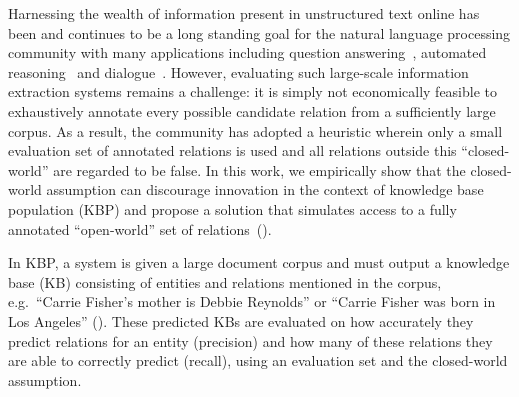 Harnessing the wealth of information present in unstructured text online has been and continues to be a long standing goal for the natural language processing community with many applications including question answering~\citep{berant2013freebase, fader2014open}, automated reasoning~\citep{kalyanpur2012structured} and dialogue~\citep{lee2015conversational,han2015exploiting}.
%
However, evaluating such large-scale information extraction systems remains a challenge:
it is simply not economically feasible to exhaustively annotate every possible candidate relation from a sufficiently large corpus.
As a result, the community has adopted a heuristic wherein only a small evaluation set of annotated relations is used and all relations outside this ``closed-world'' are regarded to be false.
In this work, we empirically show that the closed-world assumption can discourage innovation in the context of knowledge base population (KBP) and propose a solution that simulates access to a fully annotated ``open-world'' set of relations~().

In KBP, a system is given a large document corpus and must output a knowledge base (KB) consisting of entities and relations mentioned in the corpus, e.g.\ ``Carrie Fisher's mother is Debbie Reynolds'' or ``Carrie Fisher was born in Los Angeles'' (). %
These predicted KBs are evaluated on how accurately they predict relations for an entity (precision) and how many of these relations they are able to correctly predict (recall), using an evaluation set and the closed-world assumption. %

